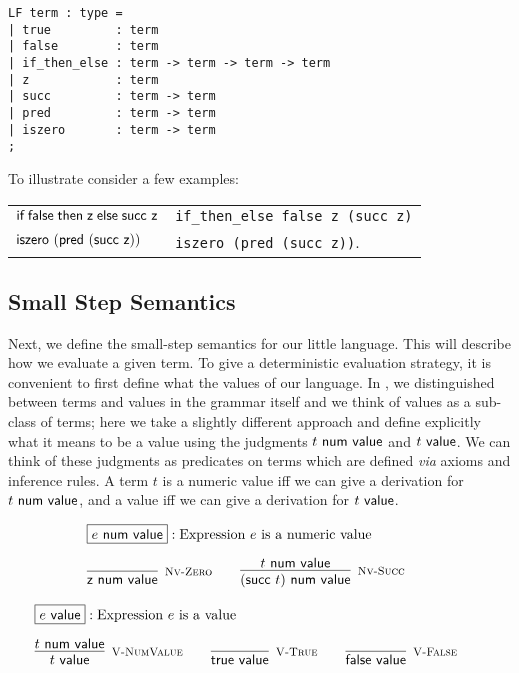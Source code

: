 \begin{lstlisting}
LF term : type =
| true         : term
| false        : term
| if_then_else : term -> term -> term -> term
| z            : term
| succ         : term -> term
| pred         : term -> term
| iszero       : term -> term
;
\end{lstlisting}

To illustrate consider a few examples:

\begin{tabular}{l@{\quad is represented as \quad}l}
$\textsf{if\;} \textsf{false} \textsf{\;then\;} \textsf{z} \textsf{\;else\;} \textsf{succ}~\textsf{z}$ &
\lstinline!if_then_else false z (succ z)!\\
$\textsf{iszero}~(\textsf{pred}~(\textsf{succ}~\textsf{z}))$ & \lstinline!iszero (pred (succ z))!.
\end{tabular}


\subsection{Small Step Semantics}

Next,  we define  the small-step semantics  for our  little language.  This will
describe  how  we evaluate  a  given term.  To give  a  deterministic evaluation
strategy,  it is convenient to first define what the values of our language.  In
\cite{TAPL}, we distinguished between terms and values in the grammar itself and
we think of values  as a sub-class of terms;  here we take  a slightly different
approach and define explicitly  what it means  to be a value using the judgments
$t ~\mathsf{num~value}$ and $t ~\mathsf{value}$.  We can think of these judgments  as predicates on
terms which are defined  {\em via}  axioms and inference rules.  A term $t$ is a
numeric value iff we can give a derivation for $t ~\mathsf{num~value}$, and a value iff we
can give a derivation for $t ~\mathsf{value}$.

\[
\begin{array}{c}
\multicolumn{1}{l}{\fbox{$e \NumValue$}: \mbox{Expression $e$ is a numeric value}}\\[1em]
\infer[\NVZero]{\tmzero \NumValue}{} \qquad
\infer[\NVSucc]{(\tmsucc t) \NumValue}{t \NumValue} \qquad
\end{array}
\]

\[
\begin{array}{c}
\multicolumn{1}{l}{\fbox{$e \Value$}: \mbox{Expression $e$ is a value}}\\[1em]
\infer[\VNumValue]{t \Value}{t \NumValue} \qquad
\infer[\VTrue]{\tmtrue \Value}{} \qquad
\infer[\VFalse]{\tmfalse \Value}{} \qquad
\end{array}
\]

